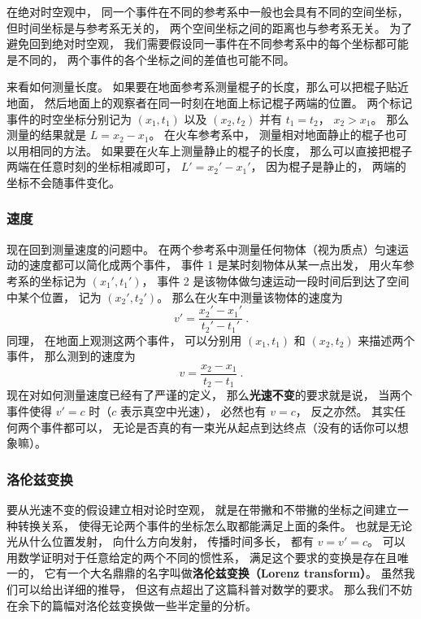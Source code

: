 在绝对时空观中， 同一个事件在不同的参考系中一般也会具有不同的空间坐标， 但时间坐标是与参考系无关的， 两个空间坐标之间的距离也与参考系无关。 为了避免回到绝对时空观， 我们需要假设同一事件在不同参考系中的每个坐标都可能是不同的， 两个事件的各个坐标之间的差值也可能不同。

来看如何测量长度。 如果要在地面参考系测量棍子的长度，那么可以把棍子贴近地面， 然后地面上的观察者在同一时刻在地面上标记棍子两端的位置。 两个标记事件的时空坐标分别记为 $(x_1, t_1)$ 以及 $(x_2, t_2)$ 并有 $t_1 = t_2$， $x_2 > x_1$。 那么测量的结果就是 $L = x_2 - x_1$。 在火车参考系中， 测量相对地面静止的棍子也可以用相同的方法。 如果要在火车上测量静止的棍子的长度， 那么可以直接把棍子两端在任意时刻的坐标相减即可， $L' = x_2' - x_1'$， 因为棍子是静止的， 两端的坐标不会随事件变化。

\subsubsection{速度}
现在回到测量速度的问题中。 在两个参考系中测量任何物体（视为质点）匀速运动的速度都可以简化成两个事件， 事件 1 是某时刻物体从某一点出发， 用火车参考系的坐标记为 $(x_1', t_1')$， 事件 2 是该物体做匀速运动一段时间后到达了空间中某个位置， 记为 $(x_2', t_2')$。 那么在火车中测量该物体的速度为
\begin{equation}\label{eq_Relat0_2}
v' = \frac{x_2' - x_1'}{t_2' - t_1'}~.
\end{equation}
同理， 在地面上观测这两个事件， 可以分别用 $(x_1, t_1)$ 和 $(x_2, t_2)$ 来描述两个事件， 那么测到的速度为
\begin{equation}\label{eq_Relat0_1}
v = \frac{x_2 - x_1}{t_2 - t_1}~.
\end{equation}
现在对如何测量速度已经有了严谨的定义， 那么\textbf{光速不变}的要求就是说， 当两个事件使得 $v' = c$ 时（$c$ 表示真空中光速）， 必然也有 $v = c$， 反之亦然。 其实任何两个事件都可以， 无论是否真的有一束光从起点到达终点（没有的话你可以想象嘛）。

\subsubsection{洛伦兹变换}
要从光速不变的假设建立相对论时空观， 就是在带撇和不带撇的坐标之间建立一种转换关系， 使得无论两个事件的坐标怎么取都能满足上面的条件。 也就是无论光从什么位置发射， 向什么方向发射， 传播时间多长， 都有 $v = v' = c$。 可以用数学证明对于任意给定的两个不同的惯性系， 满足这个要求的变换是存在且唯一的， 它有一个大名鼎鼎的名字叫做\textbf{洛伦兹变换（Lorenz transform）}。 虽然我们可以给出详细的推导， 但这有点超出了这篇科普对数学的要求。 那么我们不妨在余下的篇幅对洛伦兹变换做一些半定量的分析。

